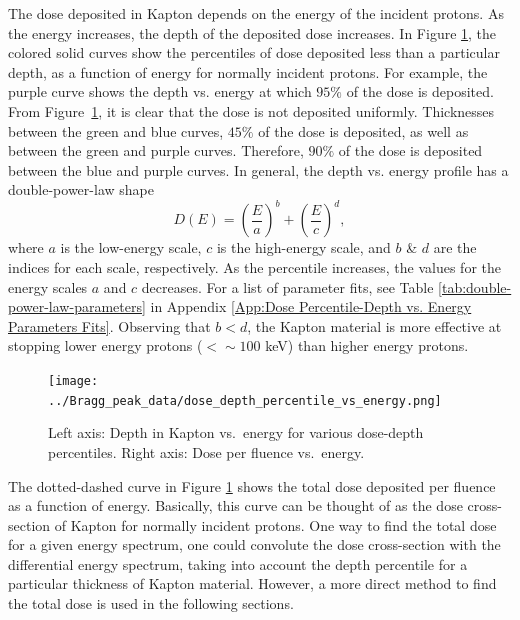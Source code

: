 \documentclass{hitec}
\begin{document}
The dose deposited in Kapton depends on the energy of the incident protons. As the energy increases, the depth of the deposited dose increases. In Figure \ref{fig:dose_depth_percentile_vs_energy}, the colored solid curves show the percentiles of dose deposited less than a particular depth, as a function of energy for normally incident protons. For example, the purple curve shows the depth vs. energy at which $95\%$ of the dose is deposited. From Figure~\ref{fig:dose_depth_percentile_vs_energy}, it is clear that the dose is not deposited  uniformly. Thicknesses between the green and blue curves, $45\%$ of the dose is deposited, as well as between the green and purple curves. Therefore, $90\%$ of the dose is deposited between the blue and purple curves. In general, the depth vs. energy profile has a double-power-law shape
\begin{equation}\label{eq:double-power-law}
	D(E) = \left(\frac{E}{a}\right)^b + \left(\frac{E}{c}\right)^d,
\end{equation}
where $a$ is the low-energy scale, $c$ is the high-energy scale, and $b$ \& $d$ are the indices for each scale, respectively. As the percentile increases, the values for the energy scales $a$ and $c$ decreases. For a list of parameter fits, see Table \ref{tab:double-power-law-parameters} in Appendix \ref{App:Dose Percentile-Depth vs. Energy Parameters Fits}. Observing that $b < d$, the Kapton material is more effective at stopping lower energy protons ($ < \sim 100$ keV) than higher energy protons.

\begin{figure}[htbp!]
	\centering
	\texttt{[image: ../Bragg\_peak\_data/dose\_depth\_percentile\_vs\_energy.png]}
	\caption{Left axis: Depth in Kapton vs.\ energy for various dose-depth percentiles. Right axis: Dose per fluence vs.\ energy.}\label{fig:dose_depth_percentile_vs_energy}
\end{figure}


The dotted-dashed curve in Figure \ref{fig:dose_depth_percentile_vs_energy} shows the total dose deposited per fluence as a function of energy. Basically, this curve can be thought of as the dose cross-section of Kapton for normally incident protons. One way to find the total dose for a given energy spectrum, one could convolute the dose cross-section with the differential energy spectrum, taking into account the depth percentile for a particular thickness of Kapton material. However, a more direct method to find the total dose is used in the following sections.
\end{document}
